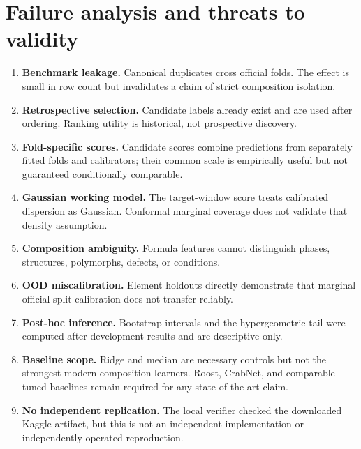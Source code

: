 \documentclass[11pt]{article}
\begin{document}
\section{Failure analysis and threats to validity}
\begin{enumerate}
\item \textbf{Benchmark leakage.} Canonical duplicates cross official folds. The effect is small in row count but invalidates a claim of strict composition isolation.
\item \textbf{Retrospective selection.} Candidate labels already exist and are used after ordering. Ranking utility is historical, not prospective discovery.
\item \textbf{Fold-specific scores.} Candidate scores combine predictions from separately fitted folds and calibrators; their common scale is empirically useful but not guaranteed conditionally comparable.
\item \textbf{Gaussian working model.} The target-window score treats calibrated dispersion as Gaussian. Conformal marginal coverage does not validate that density assumption.
\item \textbf{Composition ambiguity.} Formula features cannot distinguish phases, structures, polymorphs, defects, or conditions.
\item \textbf{OOD miscalibration.} Element holdouts directly demonstrate that marginal official-split calibration does not transfer reliably.
\item \textbf{Post-hoc inference.} Bootstrap intervals and the hypergeometric tail were computed after development results and are descriptive only.
\item \textbf{Baseline scope.} Ridge and median are necessary controls but not the strongest modern composition learners. Roost, CrabNet, and comparable tuned baselines remain required for any state-of-the-art claim.
\item \textbf{No independent replication.} The local verifier checked the downloaded Kaggle artifact, but this is not an independent implementation or independently operated reproduction.
\end{enumerate}
\end{document}
